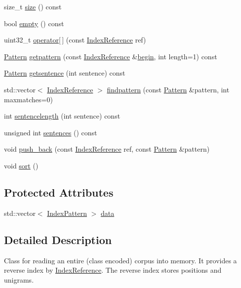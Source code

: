 \begin{DoxyCompactItemize}
\item 
size\+\_\+t \hyperlink{classIndexedCorpus_a66126ff82e6ff8d1a7792a27e1599bec}{size} () const 
\item 
bool \hyperlink{classIndexedCorpus_a71486367cec99431560824d21d90a6bc}{empty} () const 
\item 
uint32\+\_\+t \hyperlink{classIndexedCorpus_a0df27ec720cdd98b01212952ffd07d4a}{operator\mbox{[}$\,$\mbox{]}} (const \hyperlink{classIndexReference}{Index\+Reference} ref)
\item 
\hyperlink{classPattern}{Pattern} \hyperlink{classIndexedCorpus_a0c25fbcd801013189dd7f00416e3af70}{getpattern} (const \hyperlink{classIndexReference}{Index\+Reference} \&\hyperlink{classIndexedCorpus_aa8be0b3a2a730fccd755a9e12b74f869}{begin}, int length=1) const 
\item 
\hyperlink{classPattern}{Pattern} \hyperlink{classIndexedCorpus_a6398ff206b24fd8d8f0c10b2bce8d5da}{getsentence} (int sentence) const 
\item 
std\+::vector$<$ \hyperlink{classIndexReference}{Index\+Reference} $>$ \hyperlink{classIndexedCorpus_a1f2166136e96e8baac50601412e6ca87}{findpattern} (const \hyperlink{classPattern}{Pattern} \&pattern, int maxmatches=0)
\item 
int \hyperlink{classIndexedCorpus_a33e0bdd2bc93e29de9dfe5917b227197}{sentencelength} (int sentence) const 
\item 
unsigned int \hyperlink{classIndexedCorpus_ac402b5450e2b33bef72f222f1cd057c1}{sentences} () const 
\item 
void \hyperlink{classIndexedCorpus_adb0b90309c3f744cf77c05aa5c940fa5}{push\+\_\+back} (const \hyperlink{classIndexReference}{Index\+Reference} ref, const \hyperlink{classPattern}{Pattern} \&pattern)
\item 
void \hyperlink{classIndexedCorpus_aa7aa434dcc6d807941ec2e58d8ef8d98}{sort} ()
\end{DoxyCompactItemize}
\subsection*{Protected Attributes}
\begin{DoxyCompactItemize}
\item 
std\+::vector$<$ \hyperlink{classIndexPattern}{Index\+Pattern} $>$ \hyperlink{classIndexedCorpus_a27966bc680d46c0e8a22ad356cbee837}{data}
\end{DoxyCompactItemize}


\subsection{Detailed Description}
Class for reading an entire (class encoded) corpus into memory. It provides a reverse index by \hyperlink{classIndexReference}{Index\+Reference}. The reverse index stores positions and unigrams. 

